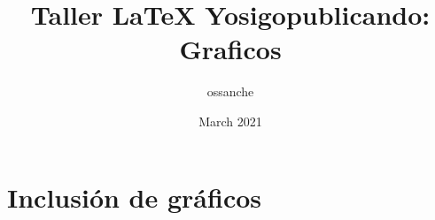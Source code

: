 \documentclass{article}
\title{Taller LaTeX Yosigopublicando: Graficos}
\author{ossanche }
\date{March 2021}
\begin{document}
\maketitle

\section{Inclusión de gráficos}
\end{document}
